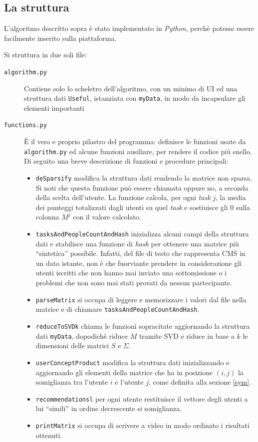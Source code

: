 \documentclass[12pt,a4paper]{article}
\theoremstyle{thm}
\theoremstyle{def}
\begin{document}

\subsection{La struttura}
L'algoritmo descritto sopra è stato implementato in \textit{Python}, perchè potesse essere facilmente inserito sulla piattaforma.

Si struttura in due soli file:
\begin{description}
\item[{\tt algorithm.py}] Contiene solo lo scheletro dell'algoritmo, con un minimo di UI ed una struttura dati \texttt{Useful}, istanziata con \texttt{myData}, in modo da incapsulare gli elementi importanti
\item[{\tt functions.py}] È il vero e proprio pilastro del programma: definisce le funzioni usate da \texttt{algorithm.py} ed alcune funzioni ausiliare, per rendere il codice più snello. Di seguito una breve descrizione di funzioni e procedure principali:
	\begin{itemize}
	\item \texttt{deSparsify} modifica la struttura dati rendendo la matrice non sparsa. Si noti che questa funzione può essere chiamata oppure no, a seconda della scelta dell'utente. La funzione calcola, per ogni \textit{task} $j$, la media dei punteggi totalizzati dagli utenti su quel \textit{task} e sostiuisce gli $0$ sulla colonna $M^j$ con il valore calcolato.
	\item \texttt{tasksAndPeopleCountAndHash} inizializza alcuni campi della struttura dati e stabilisce una funzione di \textit{hash} per ottenere una matrice più ``sintetica'' possibile. Infatti, del file di testo che rappresenta CMS in un dato istante, non è che fuorviante prendere in considerazione gli utenti iscritti che non hanno mai inviato una sottomissione o i problemi che non sono mai stati provati da nessun partecipante. 
	\item \texttt{parseMatrix} si occupa di leggere e memorizzare i valori dal file nella matrice e di chiamare \texttt{tasksAndPeopleCountAndHash}.
	\item \texttt{reduceToSVDk} chiama le funzioni sopracitate aggiornando la struttura dati \texttt{myData}, dopodichè riduce $M$ tramite SVD e riduce in base a $k$ le dimensioni delle matrici $S$ e $\Sigma$.
	\item \texttt{userConceptProduct} modifica la struttura dati inizializzando e aggiornando gli elementi della matrice che ha in posizione $(i, j)$ la somiglianza tra l'utente $i$ e l'utente $j$, come definita alla sezione \ref{sym}.
	\item \texttt{recommendationsl} per ogni utente restituisce il vettore degli utenti a lui ``simili'' in ordine decrescente si somiglianza.
	\item \texttt{printMatrix} si occupa di scrivere a video in modo ordinato i risultati ottenuti.
	\end{itemize}
\end{description}
\end{document}

